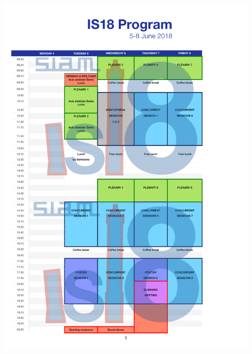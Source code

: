\documentclass[10pt, a4paper]{book}
\begin{document}



\newpage
\thispagestyle{empty}
\includegraphics[scale=0.6]{program_table.pdf}
%
%
\end{document}
